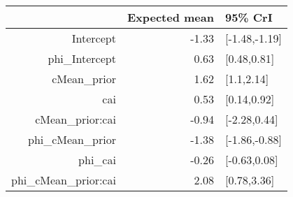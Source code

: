 \begin{tabular}{rrl}
  \hline
 & Expected mean & 95\% CrI \\ 
  \hline
Intercept & -1.33 & [-1.48,-1.19] \\ 
  phi\_Intercept & 0.63 & [0.48,0.81] \\ 
  cMean\_prior & 1.62 & [1.1,2.14] \\ 
  cai & 0.53 & [0.14,0.92] \\ 
  cMean\_prior:cai & -0.94 & [-2.28,0.44] \\ 
  phi\_cMean\_prior & -1.38 & [-1.86,-0.88] \\ 
  phi\_cai & -0.26 & [-0.63,0.08] \\ 
  phi\_cMean\_prior:cai & 2.08 & [0.78,3.36] \\ 
   \hline
\end{tabular}

